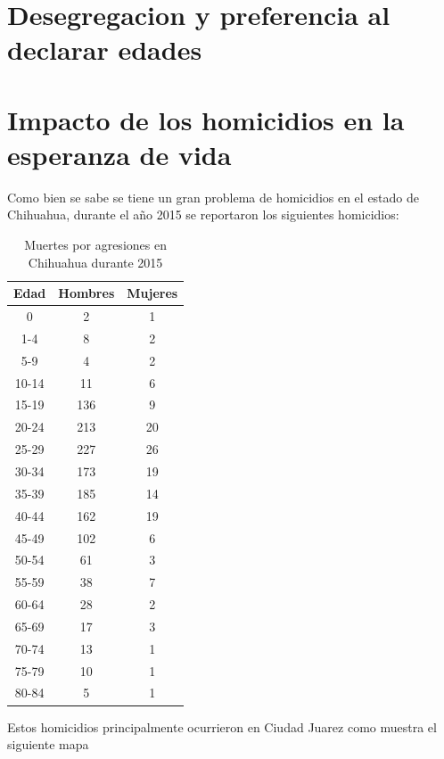 \documentclass[fontsize=11pt]{article}
\begin{document}
\section*{Desegregacion y preferencia al declarar edades}
\section*{Impacto de los homicidios en la esperanza de vida}
Como bien se sabe se tiene un gran problema de homicidios en el estado de Chihuahua, durante el año 2015 se reportaron\cite{DAT} los siguientes homicidios: 


\begin{table}[h!]
\centering

\begin{tabular}{|c|c|c|}
\hline
Edad  & Hombres & Mujeres \\ \hline
0     & 2       & 1       \\ \hline
1-4   & 8       & 2       \\ \hline
5-9   & 4       & 2       \\ \hline
10-14 & 11      & 6       \\ \hline
15-19 & 136     & 9       \\ \hline
20-24 & 213     & 20      \\ \hline
25-29 & 227     & 26      \\ \hline
30-34 & 173     & 19      \\ \hline
35-39 & 185     & 14      \\ \hline
40-44 & 162     & 19      \\ \hline
45-49 & 102     & 6       \\ \hline
50-54 & 61      & 3       \\ \hline
55-59 & 38      & 7       \\ \hline
60-64 & 28      & 2       \\ \hline
65-69 & 17      & 3       \\ \hline
70-74 & 13      & 1       \\ \hline
75-79 & 10      & 1       \\ \hline
80-84 & 5       & 1       \\ \hline
\end{tabular}
\caption{Muertes por agresiones en Chihuahua durante 2015}
\end{table}
\label{my-label}
Estos homicidios principalmente ocurrieron en Ciudad Juarez como muestra el siguiente mapa 
\center\\
\\
\\
\\
\\
\end{document}
